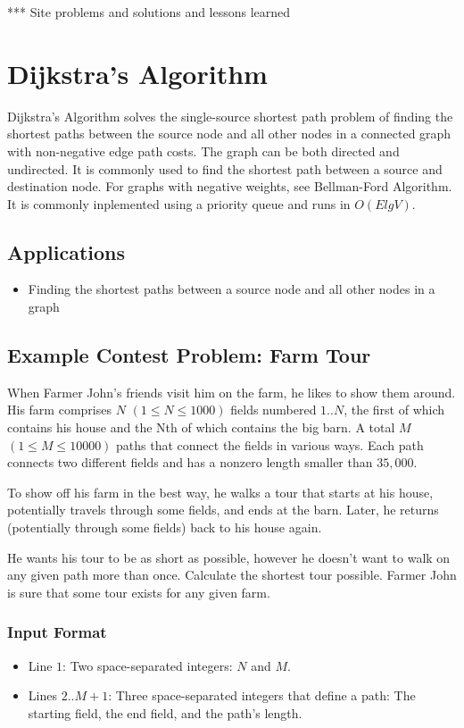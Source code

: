 *** Site problems and solutions and lessons learned 

\section{Dijkstra's Algorithm}
Dijkstra's Algorithm solves the single-source shortest path problem of finding the shortest paths between the source 
node and all other nodes in a connected graph with non-negative edge path costs.  
The graph can be both directed and undirected.  
It is commonly used to find the shortest path between a source and destination node.  
For graphs with negative weights, see Bellman-Ford Algorithm.
It is commonly inplemented using a priority queue and runs in $O(E lg V)$.

\subsection{Applications}

\begin{itemize}
	\item  Finding the shortest paths between a source node and all other nodes in a graph
\end{itemize}

\subsection{Example Contest Problem: Farm Tour\cite{farmtour}}
When Farmer John's friends visit him on the farm, he likes to show them around. 
His farm comprises $N$ $(1 \leq N \leq 1000)$ fields numbered $1..N$, the first of which contains his house and the Nth of which contains the big barn. 
A total $M$ $(1 \leq M \leq 10000)$ paths that connect the fields in various ways. 
Each path connects two different fields and has a nonzero length smaller than $35,000$. 

To show off his farm in the best way, he walks a tour that starts at his house, potentially travels through some fields, and ends at the barn. 
Later, he returns (potentially through some fields) back to his house again. 

He wants his tour to be as short as possible, however he doesn't want to walk on any given path more than once. 
Calculate the shortest tour possible. 
Farmer John is sure that some tour exists for any given farm.

\subsubsection{Input Format}
\begin{itemize}
	\item Line $1$: Two space-separated integers: $N$ and $M$. 
	\item Lines $2..M+1$: Three space-separated integers that define a path: The starting field, the end field, and the path's length. 
\end{itemize}

